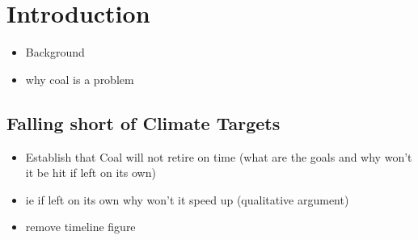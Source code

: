 \documentclass{article}
\begin{document}



    

\section{Introduction}
\begin{itemize}
    \item Background 
    \item why coal is a problem
\end{itemize}

\subsection{Falling short of Climate Targets}
\begin{itemize}
    \item Establish that Coal will not retire on time (what are the goals and why won't it be hit if left on its own)
    \item ie if left on its own why won't it speed up (qualitative argument)
    \item remove timeline figure 
\end{itemize}
\end{document}
